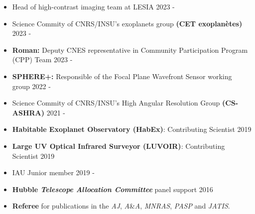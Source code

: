 \documentclass[11pt]{article}
\begin{document}
\begin{itemize} \itemsep -2pt
    \item \small Head of high-contrast imaging team at LESIA \hfill 2023 - 
    \item \small Science Commity of CNRS/INSU's exoplanets group \textbf{(CET exoplanètes)}  \hfill 2023 - 
    \item \small \textbf{Roman:} Deputy CNES representative in Community Participation Program (CPP) Team  \hfill 2023 - 
    \item \small \textbf{SPHERE+:} Responsible of the Focal Plane Wavefront Sensor working group \hfill 2022 - 
    \item \small Science Commity of CNRS/INSU's High Angular Resolution Group \textbf{(CS-ASHRA)} \hfill 2021 - 
    \item \small \textbf{Habitable Exoplanet Observatory (HabEx)}: Contributing Scientist \hfill 2019
    \item \small \textbf{Large UV Optical Infrared Surveyor (LUVOIR)}: Contributing Scientist \hfill 2019
    \item \small IAU Junior member \hfill 2019 - 
    \item \small \textbf{Hubble \textit{Telescope Allocation Committee}} panel support \hfill 2016 
    \item \small \textbf{Referee} for publications in the \textit{AJ}, \textit{A}\&\textit{A}, \textit{MNRAS}, \textit{PASP} and \textit{JATIS}.
\end{itemize}





\end{document}
